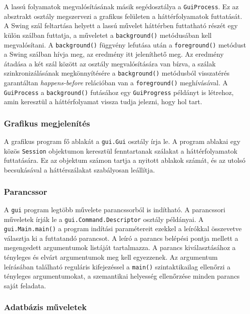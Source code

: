 A lassú folyamatok megvalósításának másik segédosztálya a \texttt{GuiProcess}.
Ez az absztrakt osztály megszervezi a grafikus felületen a háttérfolyamatok futtatását.
A Swing szál feltartása helyett a lassú művelet háttérben futtatható részét egy külön szálban futtatja, a műveletet a \texttt{background()} metódusában kell megvalósítani.
A \texttt{background()} függvény lefutása után a \texttt{foreground()} metódust a Swing szálban hívja meg, az eredmény itt jeleníthető meg.
Az eredmény átadása a két szál között az osztály megvalósítására van bízva, a szálak szinkronizálásának megkönnyítésére a \texttt{background()} metódusból visszatérés garantáltan \textit{happens-before} relációban van a \texttt{foreground()} meghívásával.
A \texttt{GuiProcess} a \texttt{background()} futásához egy \texttt{GuiProgress} példányt is létrehoz, amin keresztül a háttérfolyamat vissza tudja jelezni, hogy hol tart.

\subsubsection{Grafikus megjelenítés}

A grafikus program fő ablakát a \texttt{gui.Gui} osztály írja le.
A program ablakai egy közös \texttt{Session} objektumon keresztül fenntartanak szálakat a háttérfolyamatok futtatására.
Ez az objektum számon tartja a nyitott ablakok számát, és az utolsó becsukásával a háttérszálakat szabályosan leállítja.

\subsubsection{Parancssor}

A \texttt{gui} program legtöbb művelete parancssorból is indítható.
A parancssori műveletek írják le a \texttt{gui.Command.Descriptor} osztály példányai. A \texttt{gui.Main.main()} a program indítási paramétereit ezekkel a leírókkal összevetve választja ki a futtatandó parancsot.
A leíró a parancs belépési pontja mellett a megengedett argumentumok listáját tartalmazza.
A parancs kiválasztásához a tényleges és elvárt argumentumok meg kell egyezzenek.
Az argumentum leírásában található reguláris kifejezéssel a \texttt{main()} szintaktikailag ellenőrzi a tényleges argumentumokat, a szemantikai helyesség ellenőrzése minden parancs saját feladata.

\subsubsection{Adatbázis műveletek}

